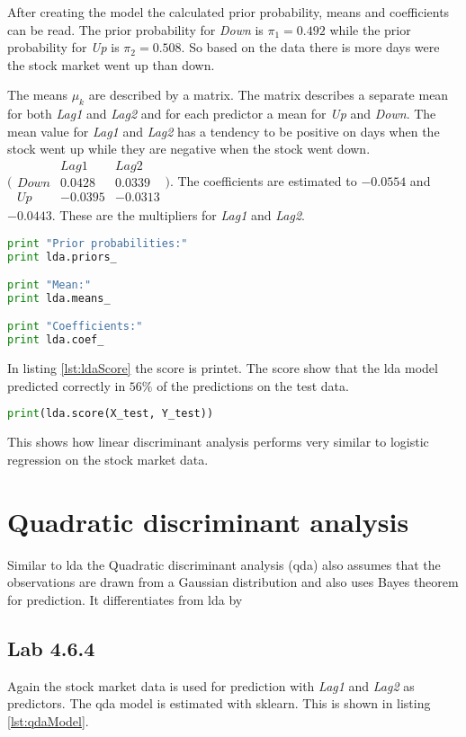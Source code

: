 After creating the model the calculated prior probability, means and coefficients can be read. The prior probability for \emph{Down} is $\pi_1=0.492$ while the prior probability for \emph{Up} is $\pi_2=0.508$. So based on the data there is more days were the stock market went up than down. 

The means $\mu_k$ are described by a matrix. The matrix describes a separate mean for both \emph{Lag1} and \emph{Lag2} and for each predictor a mean for \emph{Up} and \emph{Down}. The mean value for \emph{Lag1} and \emph{Lag2} has a tendency to be positive on days when the stock went up while they are negative when the stock went down.  $\bigl( \begin{smallmatrix} 	 & Lag1 & Lag2	\\ 	 Down & 0.0428 & 0.0339 \\ 	 Up & -0.0395 & -0.0313 \end{smallmatrix} \bigr) $. The coefficients are estimated to $-0.0554$ and $-0.0443$. These are the multipliers for \emph{Lag1} and \emph{Lag2}.

\begin{lstlisting}[language=Python, label=lst:ldaProperties, caption=printing lda prior mean and coefficients]
print "Prior probabilities:"
print lda.priors_

print "Mean:"
print lda.means_

print "Coefficients:"
print lda.coef_
\end{lstlisting}

In listing \ref{lst:ldaScore} the score is printet. The score show that the lda model predicted correctly in $56\%$ of the predictions on the test data. 
\begin{lstlisting}[language=Python, label=lst:ldaScore, caption=printing lda score]
print(lda.score(X_test, Y_test))
\end{lstlisting}

This shows how linear discriminant analysis performs very similar to logistic regression on the stock market data.

\section{Quadratic discriminant analysis}
Similar to lda the Quadratic discriminant analysis (qda) also assumes that the observations are drawn from a Gaussian distribution and also uses Bayes theorem for prediction. It differentiates from lda by 

\subsection{Lab 4.6.4}
Again the stock market data is used for prediction with \emph{Lag1} and \emph{Lag2} as predictors. The qda model is estimated with sklearn. This is shown in listing \ref{lst:qdaModel}.

